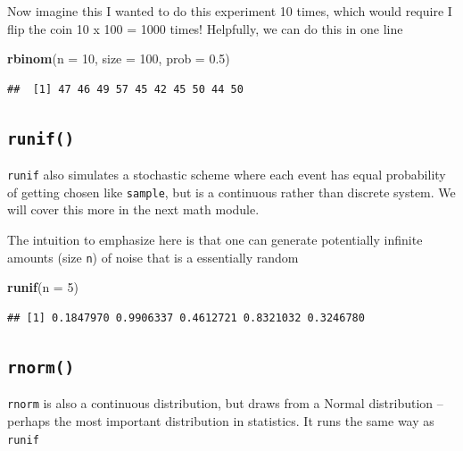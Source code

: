 \documentclass[]{book}
\newenvironment{Shaded}{\begin{snugshade}}{\end{snugshade}}
\newcommand{\KeywordTok}[1]{\textcolor[rgb]{0.13,0.29,0.53}{\textbf{#1}}}
\newcommand{\DataTypeTok}[1]{\textcolor[rgb]{0.13,0.29,0.53}{#1}}
\newcommand{\DecValTok}[1]{\textcolor[rgb]{0.00,0.00,0.81}{#1}}
\newcommand{\FloatTok}[1]{\textcolor[rgb]{0.00,0.00,0.81}{#1}}
\newcommand{\NormalTok}[1]{#1}
\theoremstyle{definition}
\theoremstyle{definition}
\theoremstyle{definition}
\theoremstyle{remark}
\begin{document}
Now imagine this I wanted to do this experiment 10 times, which would
require I flip the coin 10 x 100 = 1000 times! Helpfully, we can do this
in one line

\begin{Shaded}
\begin{Highlighting}[]
\KeywordTok{rbinom}\NormalTok{(}\DataTypeTok{n =} \DecValTok{10}\NormalTok{, }\DataTypeTok{size =} \DecValTok{100}\NormalTok{, }\DataTypeTok{prob =} \FloatTok{0.5}\NormalTok{)}
\end{Highlighting}
\end{Shaded}

\begin{verbatim}
##  [1] 47 46 49 57 45 42 45 50 44 50
\end{verbatim}

\subsection*{\texorpdfstring{\texttt{runif()}}{runif()}}\label{runif}

\texttt{runif} also simulates a stochastic scheme where each event has
equal probability of getting chosen like \texttt{sample}, but is a
continuous rather than discrete system. We will cover this more in the
next math module.

The intuition to emphasize here is that one can generate potentially
infinite amounts (size \texttt{n}) of noise that is a essentially random

\begin{Shaded}
\begin{Highlighting}[]
\KeywordTok{runif}\NormalTok{(}\DataTypeTok{n =} \DecValTok{5}\NormalTok{)}
\end{Highlighting}
\end{Shaded}

\begin{verbatim}
## [1] 0.1847970 0.9906337 0.4612721 0.8321032 0.3246780
\end{verbatim}

\subsection*{\texorpdfstring{\texttt{rnorm()}}{rnorm()}}\label{rnorm}

\texttt{rnorm} is also a continuous distribution, but draws from a
Normal distribution -- perhaps the most important distribution in
statistics. It runs the same way as \texttt{runif}
\end{document}
